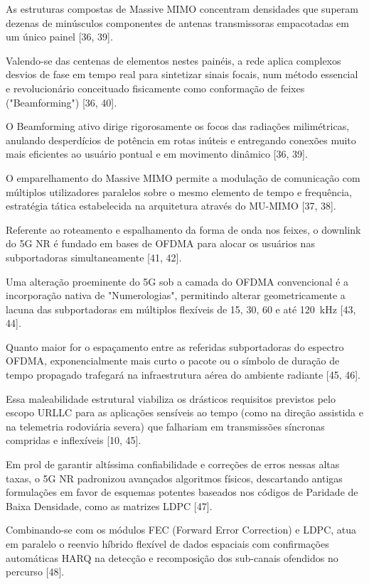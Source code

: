As estruturas compostas de Massive \gls{MIMO} concentram densidades que superam dezenas de minúsculos componentes de antenas transmissoras empacotadas em um único painel [36, 39].

Valendo-se das centenas de elementos nestes painéis, a rede aplica complexos desvios de fase em tempo real para sintetizar sinais focais, num método essencial e revolucionário conceituado fisicamente como conformação de feixes ("Beamforming") [36, 40].

O Beamforming ativo dirige rigorosamente os focos das radiações milimétricas, anulando desperdícios de potência em rotas inúteis e entregando conexões muito mais eficientes ao usuário pontual e em movimento dinâmico [36, 39].

O emparelhamento do Massive \gls{MIMO} permite a modulação de comunicação com múltiplos utilizadores paralelos sobre o mesmo elemento de tempo e frequência, estratégia tática estabelecida na arquitetura através do \gls{MU-MIMO} [37, 38].

Referente ao roteamento e espalhamento da forma de onda nos feixes, o downlink do \gls{5G} \gls{NR} é fundado em bases de \gls{OFDMA} para alocar os usuários nas subportadoras simultaneamente [41, 42].

Uma alteração proeminente do \gls{5G} sob a camada do \gls{OFDMA} convencional é a incorporação nativa de "Numerologias", permitindo alterar geometricamente a lacuna das subportadoras em múltiplos flexíveis de 15, 30, 60 e até 120~kHz [43, 44].

Quanto maior for o espaçamento entre as referidas subportadoras do espectro \gls{OFDMA}, exponencialmente mais curto o pacote ou o símbolo de duração de tempo propagado trafegará na infraestrutura aérea do ambiente radiante [45, 46].

Essa maleabilidade estrutural viabiliza os drásticos requisitos previstos pelo escopo \gls{URLLC} para as aplicações sensíveis ao tempo (como na direção assistida e na telemetria rodoviária severa) que falhariam em transmissões síncronas compridas e inflexíveis [10, 45].

Em prol de garantir altíssima confiabilidade e correções de erros nessas altas taxas, o \gls{5G} \gls{NR} padronizou avançados algoritmos físicos, descartando antigas formulações em favor de esquemas potentes baseados nos códigos de Paridade de Baixa Densidade, como as matrizes LDPC [47].

Combinando-se com os módulos FEC (Forward Error Correction) e LDPC, atua em paralelo o reenvio híbrido flexível de dados espaciais com confirmações automáticas \gls{HARQ} na detecção e recomposição dos sub-canais ofendidos no percurso [48].

